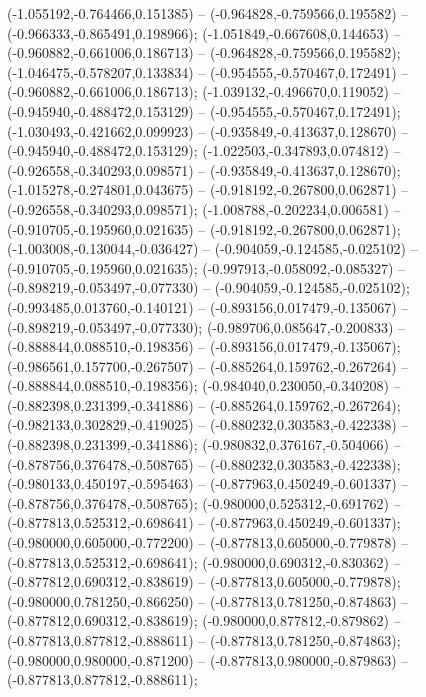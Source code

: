  (-1.055192,-0.764466,0.151385) -- (-0.964828,-0.759566,0.195582) -- (-0.966333,-0.865491,0.198966);
 (-1.051849,-0.667608,0.144653) -- (-0.960882,-0.661006,0.186713) -- (-0.964828,-0.759566,0.195582);
 (-1.046475,-0.578207,0.133834) -- (-0.954555,-0.570467,0.172491) -- (-0.960882,-0.661006,0.186713);
 (-1.039132,-0.496670,0.119052) -- (-0.945940,-0.488472,0.153129) -- (-0.954555,-0.570467,0.172491);
 (-1.030493,-0.421662,0.099923) -- (-0.935849,-0.413637,0.128670) -- (-0.945940,-0.488472,0.153129);
 (-1.022503,-0.347893,0.074812) -- (-0.926558,-0.340293,0.098571) -- (-0.935849,-0.413637,0.128670);
 (-1.015278,-0.274801,0.043675) -- (-0.918192,-0.267800,0.062871) -- (-0.926558,-0.340293,0.098571);
 (-1.008788,-0.202234,0.006581) -- (-0.910705,-0.195960,0.021635) -- (-0.918192,-0.267800,0.062871);
 (-1.003008,-0.130044,-0.036427) -- (-0.904059,-0.124585,-0.025102) -- (-0.910705,-0.195960,0.021635);
 (-0.997913,-0.058092,-0.085327) -- (-0.898219,-0.053497,-0.077330) -- (-0.904059,-0.124585,-0.025102);
 (-0.993485,0.013760,-0.140121) -- (-0.893156,0.017479,-0.135067) -- (-0.898219,-0.053497,-0.077330);
 (-0.989706,0.085647,-0.200833) -- (-0.888844,0.088510,-0.198356) -- (-0.893156,0.017479,-0.135067);
 (-0.986561,0.157700,-0.267507) -- (-0.885264,0.159762,-0.267264) -- (-0.888844,0.088510,-0.198356);
 (-0.984040,0.230050,-0.340208) -- (-0.882398,0.231399,-0.341886) -- (-0.885264,0.159762,-0.267264);
 (-0.982133,0.302829,-0.419025) -- (-0.880232,0.303583,-0.422338) -- (-0.882398,0.231399,-0.341886);
 (-0.980832,0.376167,-0.504066) -- (-0.878756,0.376478,-0.508765) -- (-0.880232,0.303583,-0.422338);
 (-0.980133,0.450197,-0.595463) -- (-0.877963,0.450249,-0.601337) -- (-0.878756,0.376478,-0.508765);
 (-0.980000,0.525312,-0.691762) -- (-0.877813,0.525312,-0.698641) -- (-0.877963,0.450249,-0.601337);
 (-0.980000,0.605000,-0.772200) -- (-0.877813,0.605000,-0.779878) -- (-0.877813,0.525312,-0.698641);
 (-0.980000,0.690312,-0.830362) -- (-0.877812,0.690312,-0.838619) -- (-0.877813,0.605000,-0.779878);
 (-0.980000,0.781250,-0.866250) -- (-0.877813,0.781250,-0.874863) -- (-0.877812,0.690312,-0.838619);
 (-0.980000,0.877812,-0.879862) -- (-0.877813,0.877812,-0.888611) -- (-0.877813,0.781250,-0.874863);
 (-0.980000,0.980000,-0.871200) -- (-0.877813,0.980000,-0.879863) -- (-0.877813,0.877812,-0.888611);
